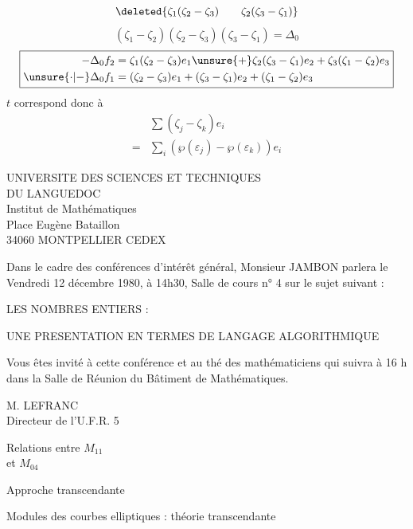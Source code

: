\[
\deleted{\zeta_1(\zeta_2-\zeta_3)\qquad\zeta_2(\zeta_3-\zeta_1)}
\]
\[
(\zeta_1-\zeta_2)(\zeta_2-\zeta_3)(\zeta_3-\zeta_1)=\Delta_0
\]
\[
\boxed{\begin{aligned}
-\Delta_0f_2&=\zeta_1(\zeta_2-\zeta_3)e_1\unsure{+}\zeta_2(\zeta_3-\zeta_1)e_2+\zeta_3(\zeta_1-\zeta_2)e_3\\
\unsure{\cdot|-}\Delta_0f_1&=(\zeta_2-\zeta_3)e_1+(\zeta_3-\zeta_1)e_2+(\zeta_1-\zeta_2)e_3
\end{aligned}}
\]
$t$ correspond donc à
\[
\begin{aligned}
&\sum(\zeta_j-\zeta_k)e_i\\
={}&\sum_i(\wp(\varepsilon_j)-\wp(\varepsilon_k))e_i
\end{aligned}
\]

\begin{center}
UNIVERSITE DES SCIENCES ET TECHNIQUES\\
DU LANGUEDOC\\
Institut de Mathématiques\\
Place Eugène Bataillon\\
34060 MONTPELLIER CEDEX
\end{center}

Dans le cadre des conférences d'intérêt général, Monsieur JAMBON parlera le Vendredi 12 décembre 1980, à 14h30, Salle de cours n° 4 sur le sujet suivant :

\begin{center}
LES NOMBRES ENTIERS :

UNE PRESENTATION EN TERMES DE LANGAGE ALGORITHMIQUE
\end{center}

Vous êtes invité à cette conférence et au thé des mathématiciens qui suivra à 16 h dans la Salle de Réunion du Bâtiment de Mathématiques.

M. LEFRANC\\
Directeur de l'U.F.R. 5

Relations entre $M_{11}$\\
et $M_{04}$

Approche transcendante

Modules des courbes elliptiques : théorie transcendante

